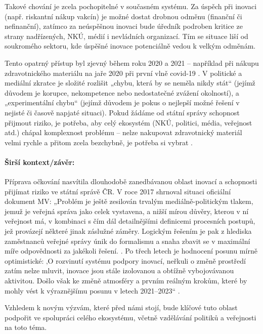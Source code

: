 Takové chování je zcela pochopitelné v současném systému. Za úspěch při inovaci (např. riskantní nákup vakcín) je možné dostat drobnou odměnu (finanční či nefinanční), zatímco za neúspěšnou inovaci bude úředník podroben kritice ze strany nadřízených, NKÚ, médií i nevládních organizací. Tím se situace liší od soukromého sektoru, kde úspěšné inovace potenciálně vedou k velkým odměnám.

Tento opatrný přístup byl zjevný během roku 2020 a 2021 -- například při nákupu zdravotnického materiálu na jaře 2020 při první vlně covid-19 \cite{nejvyssi_kontrolni_urad_stat_2021}. V politické a mediální zkratce je složité rozlišit „chybu, která by se neměla nikdy stát“ (jejímž důvodem je korupce, nekompetence nebo nedostatečné zvážení okolností), a „experimentální chybu“ (jejímž důvodem je pokus o nejlepší možné řešení v nejisté či časově napjaté situaci). Pokud žádáme od státní správy schopnost přijmout riziko, je potřeba, aby celý ekosystém (NKÚ, politici, média, veřejnost atd.) chápal komplexnost problému -- nelze nakupovat zdravotnický materiál velmi rychle a přitom zcela bezchybně, je potřeba si vybrat \cite{noauthor_how_2020}.

\paragraph{Širší kontext/závěr:} Příprava očkování nasvítila dlouhodobě zanedbávanou oblast inovací a schopnosti přijímat riziko ve státní správě ČR. V roce 2017 shrnoval situaci oficiální dokument MV: „Problém je ještě zesilován trvalým mediálně-politickým tlakem, jemuž je veřejná správa jako celek vystavena, a nižší mírou důvěry, kterou v ní veřejnost má, v kombinaci s čím dál detailnějšími definicemi procesních postupů, jež provázejí některé jinak záslužné záměry. Logickým řešením je pak z hlediska zaměstnanců veřejné správy únik do formalismu a snaha zbavit se v maximální míře odpovědnosti za jakékoli řešení. \cite{pg:polasek2016}. Po třech letech je hodnocení posunu mírně optimistické: ‚O rozvinutí systému podpory inovací, neřkuli o změně prostředí zatím nelze mluvit, inovace jsou stále izolovanou a obtížně vybojovávanou aktivitou. Došlo však ke změně atmosféry a prvním reálným krokům, které by mohly vést k výraznějšímu posunu v letech 2021–2023“ \cite{cr2030_kvalita_udrzitelnost}.

Vzhledem k novým výzvám, které před námi stojí, bude klíčové tuto oblast
podpořit ve spolupráci celého ekosystému, včetně vzdělávání politiků a
veřejnosti na toto téma.

